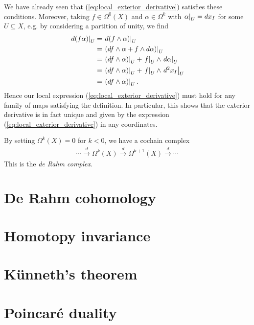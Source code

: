 \documentclass{article}
\begin{document}
We have already seen that (\ref{eq:local_exterior_derivative}) satisfies
these conditions. Moreover, taking $f\in\Omega^0(X)$ and $\alpha\in\Omega^k$
with $\left.{\alpha}\right\vert_{U} = dx_I$ for some $U\subseteq X$, e.g. by considering a partition of unity, we find
\begin{align*}
  \left.{d(f\alpha)}\right\vert_{U}
  &= \left.{d(f\wedge\alpha)}\right\vert_{U}\\
  &= \left.{(df\wedge\alpha + f\wedge d\alpha)}\right\vert_{U}\\
  &= \left.{(df\wedge\alpha)}\right\vert_{U} + \left.{f}\right\vert_{U}\wedge \left.{d\alpha}\right\vert_{U}\\
  &= \left.{(df\wedge\alpha)}\right\vert_{U} + \left.{f}\right\vert_{U}\wedge \left.{d^2x_I}\right\vert_{U}\\
  &= \left.{(df\wedge\alpha)}\right\vert_{U}.
\end{align*}
Hence our local expression (\ref{eq:local_exterior_derivative}) must
hold for any family of maps satisfying the definition. In particular,
this shows that the exterior derivative is in fact unique and given by
the expression (\ref{eq:local_exterior_derivative}) in any coordinates.

By setting $\Omega^k(X)=0$ for $k<0$, we have a cochain complex
\begin{align*}
  \cdots
  \xrightarrow{d} \Omega^k(X)
  \xrightarrow{d} \Omega^{k+1}(X)
  \xrightarrow{d} \cdots
\end{align*}
This is the \emph{de Rahm complex}.

\section{De Rahm cohomology}

\section{Homotopy invariance}

\section{K\"unneth's theorem}

\section{Poincar\'e duality}
\end{document}

